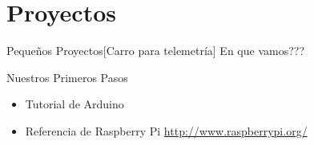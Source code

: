 \section{Proyectos}

\begin{frame}{Pequeños Proyectos}[Carro para telemetría]
	En que vamos???
\end{frame} 


\begin{frame}{Nuestros Primeros Pasos}
	\begin{itemize}
		\item Tutorial de Arduino
		\item Referencia de Raspberry Pi \url{http://www.raspberrypi.org/}
	\end{itemize}
\end{frame}
     
